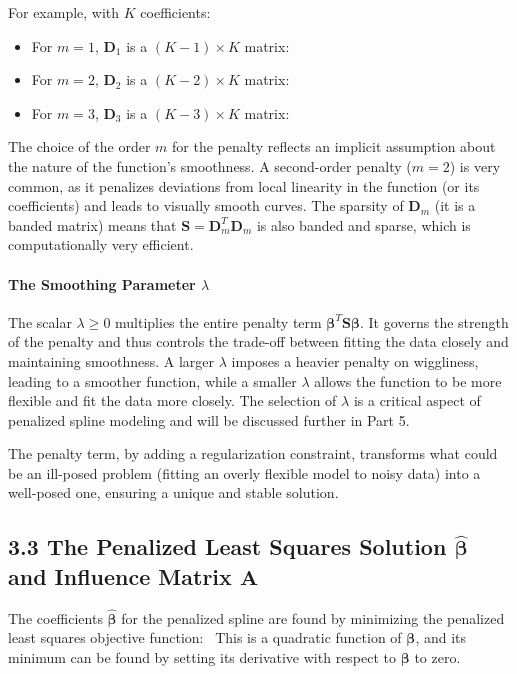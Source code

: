 \documentclass[11pt, a4paper]{article}
\begin{document}
\begin{itemize}
For example, with $K$ coefficients:
\begin{itemize}
 \item For $m=1$, $\mathbf{D}_1$ is a $(K-1) \times K$ matrix:
 \
 \item For $m=2$, $\mathbf{D}_2$ is a $(K-2) \times K$ matrix:
 \
 \item For $m=3$, $\mathbf{D}_3$ is a $(K-3) \times K$ matrix:
 \
\end{itemize}
The choice of the order $m$ for the penalty reflects an implicit assumption about the nature of the function's smoothness. A second-order penalty ($m=2$) is very common, as it penalizes deviations from local linearity in the function (or its coefficients) and leads to visually smooth curves. The sparsity of $\mathbf{D}_m$ (it is a banded matrix) means that $\mathbf{S}=\mathbf{D}_m^T\mathbf{D}_m$ is also banded and sparse, which is computationally very efficient.

\paragraph{The Smoothing Parameter $\lambda$}
The scalar $\lambda \ge 0$ multiplies the entire penalty term $\boldsymbol{\beta}^T \mathbf{S} \boldsymbol{\beta}$. It governs the strength of the penalty and thus controls the trade-off between fitting the data closely and maintaining smoothness. A larger $\lambda$ imposes a heavier penalty on wiggliness, leading to a smoother function, while a smaller $\lambda$ allows the function to be more flexible and fit the data more closely. The selection of $\lambda$ is a critical aspect of penalized spline modeling and will be discussed further in Part 5.

The penalty term, by adding a regularization constraint, transforms what could be an ill-posed problem (fitting an overly flexible model to noisy data) into a well-posed one, ensuring a unique and stable solution.

\subsection{3.3 The Penalized Least Squares Solution $\hat{\boldsymbol{\beta}}$ and Influence Matrix $\mathbf{A}$}
The coefficients $\hat{\boldsymbol{\beta}}$ for the penalized spline are found by minimizing the penalized least squares objective function:
\
This is a quadratic function of $\boldsymbol{\beta}$, and its minimum can be found by setting its derivative with respect to $\boldsymbol{\beta}$ to zero.


\end{itemize}
\end{document}
